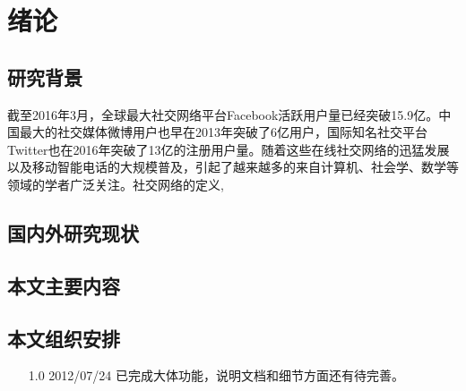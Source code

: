 \chapter{绪论}

\section{研究背景}

\quad 截至2016年3月，全球最大社交网络平台Facebook活跃用户量已经突破15.9亿。中国最大的社交媒体微博用户也早在2013年突破了6亿用户，国际知名社交平台Twitter也在2016年突破了13亿的注册用户量。随着这些在线社交网络的迅猛发展以及移动智能电话的大规模普及，引起了越来越多的来自计算机、社会学、数学等领域的学者广泛关注。社交网络的定义\cite{刘军2004社会网络分析导论},



\section{国内外研究现状}






\section{本文主要内容}


\section{本文组织安排}
\begin{itemize}
    \item[1.0] 2012/07/24 已完成大体功能，说明文档和细节方面还有待完善。
\end{itemize}
